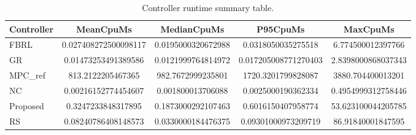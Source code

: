 \begin{table}[t]
\centering
\caption{Controller runtime summary table.}
\label{tab:runtime_auto}
\begin{tabular}{lcccc}
\toprule
Controller & MeanCpuMs & MedianCpuMs & P95CpuMs & MaxCpuMs \\
\midrule
FBRL & 0.027408272500098117 & 0.0195000320672988 & 0.0318050035275518 & 6.774500012397766 \\
GR & 0.01473253491389586 & 0.0121999764814972 & 0.017205008771270403 & 2.8398000868037343 \\
MPC\_ref & 813.2122205467365 & 982.7672999235801 & 1720.3201799828087 & 3880.704400013201 \\
NC & 0.00216152774454607 & 0.001800013706088 & 0.0025000190362334 & 0.4954999312758446 \\
Proposed & 0.3247233848317895 & 0.1873000292107463 & 0.6016150407958774 & 53.623100044205785 \\
RS & 0.08240786408148573 & 0.0330000184476375 & 0.09301000973209719 & 86.91840001847595 \\
\bottomrule
\end{tabular}
\end{table}